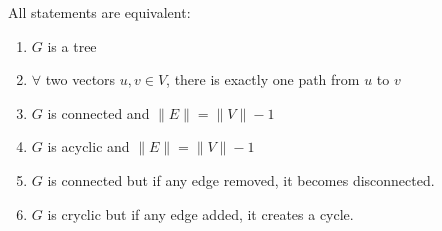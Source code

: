 \begin{itemize}
\begin{definition}
		\end{definition}
		\begin{theorem}
			All statements are equivalent:
			\begin{enumerate}
				\item $G$ is a tree\\
				\item $\forall$ two vectors $u, v \in V$, there is exactly one path from $u$ to $v$\\
				\item $G$ is connected and $\lVert E \rVert = \lVert V \rVert - 1$\\
				\item $G$ is acyclic and $\lVert E \rVert = \lVert V \rVert - 1$\\
				\item $G$ is connected but if any edge removed, it becomes disconnected.\\
				\item $G$ is cryclic but if any edge added, it creates a cycle.
			\end{enumerate}
		\end{theorem}
\end{itemize}
